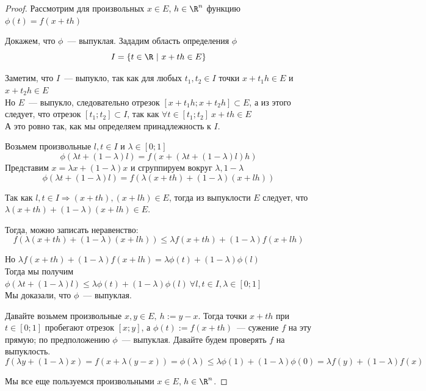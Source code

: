 \begin{proof}
  Рассмотрим для произвольных $x \in E$, $h \in \R^n$ функцию $\phi(t) = f(x + th)$

  \proofstep{$\Leftarrow$}
  Докажем, что $\phi$~--- выпуклая. Зададим область определения $\phi$
  \[
  I = \left\{ t \in \R\ |\ x + th \in E \right\}
  \]

  Заметим, что $I$~--- выпукло, так как для любых $t_1, t_2 \in I$
  точки $x + t_1h \in E$  и $x+ t_2h \in E$ \\
  Но $E$~--- выпукло, следовательно отрезок $[x + t_1 h; x + t_2h] \subset E$,
  а из этого следует, что отрезок $[t_1; t_2] \subset I$, так как $\forall t \in [t_1; t_2]\ x + th \in E$ \\
  А это ровно так, как мы определяем принадлежность к $I$.

  Возьмем произвольные $l, t \in I$ и $\lambda \in [0;1]$
  \[
  \phi(\lambda t + (1-\lambda) l) = f(x + (\lambda t + (1-\lambda)l)h)
  \]
  Представим $x = \lambda x + (1-\lambda) x$ и сгруппируем вокруг $\lambda, 1-\lambda$
  \[
  \phi(\lambda t + (1-\lambda) l) = f(\lambda (x + th) + (1-\lambda)(x + lh))
  \]

  Так как $l, t \in I \Rightarrow (x + th), (x+lh) \in E$, тогда из выпуклости $E$ следует, что
  $\lambda (x + th) + (1-\lambda)(x + lh) \in E$.

  Тогда, можно записать неравенство:
  \[
  f(\lambda (x + th) + (1-\lambda)(x + lh)) \le \lambda f(x + th) + (1-\lambda)f(x + lh)
  \]

  Но $\lambda f(x + th) + (1-\lambda)f(x + lh) = \lambda \phi(t) + (1-\lambda) \phi(l)$ \\
  Тогда мы получим $\phi(\lambda t + (1-\lambda) l) \le \lambda \phi(t) + (1 - \lambda)\phi(l)\ \forall l,t \in I, \lambda \in [0;1]$ \\
  Мы доказали, что $\phi$~--- выпуклая.

  \proofstep{$\Rightarrow$}
  Давайте возьмем произвольные $x, y \in E,\ h := y-x$.
  Тогда точки $x + th$ при $t \in [0;1]$ пробегают отрезок $[x;y]$, а $\phi(t) := f(x + th)$~--- сужение $f$ на эту прямую; по предположению $\phi$~--- выпуклая.
  Давайте будем проверять $f$ на выпуклость.
  \[
  f(\lambda y + (1-\lambda) x) = f (x + \lambda (y - x)) = \phi(\lambda) \le \lambda \phi(1) + (1-\lambda) \phi(0) = \lambda f(y) + (1-\lambda) f(x)
  \]

  \proofstep{$\Rightarrow$}
  Мы все еще пользуемся произвольными $x \in E$, $h \in \R^n$.


\end{proof}
